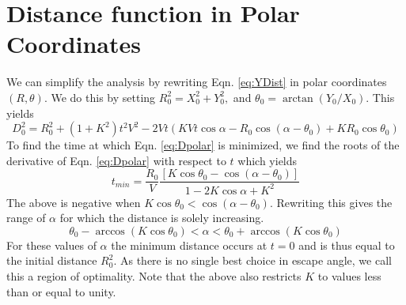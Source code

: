 \documentclass[12pt]{article}
\def\ds{\displaystyle}
\begin{document}
\section{Distance function in Polar Coordinates}
We can simplify the analysis by rewriting Eqn. \ref{eq:YDist} in polar coordinates $(R,\theta)$. We do this by setting $R_0^2 = X_0^2 + Y_0^2,$ and $\theta_0 = \arctan(Y_0/X_0)$. This yields 
%
\begin{equation}
D_0^2 = R_0^2 + (1 + K^2) t^2 V^2 - 
 2 V t(K V t \cos \alpha  - R_0 \cos(\alpha - \theta_0) + K R_0 \cos \theta_0) 
 \label{eq:Dpolar}
\end{equation}
%
To find the time at which Eqn. \ref{eq:Dpolar} is minimized, we find the roots of the derivative of Eqn. \ref{eq:Dpolar} with respect to $t$ which yields
%
\begin{equation}
t_{min} = \ds \frac{R_0}{V} \frac{\left[K \cos \theta_0 - \cos(\alpha - \theta_0)\right ]}{1- 2K \cos \alpha + K^2}
\label{eq:tmin}
\end{equation}
%
The above is negative when $K \cos \theta_0 < \cos(\alpha - \theta_0).$ Rewriting this gives the range of $\alpha$ for which the distance is solely increasing. 
%
\begin{equation}
\theta_0 - \arccos(K \cos \theta_0) < \alpha < \theta_0 + \arccos(K \cos \theta_0)
\label{eq:alphabound}
\end{equation}
%
For these values of $\alpha$ the minimum distance occurs at $t=0$ and is thus equal to the initial distance $R_0^2$. As there is no single best choice in escape angle, we call this a region of optimality. Note that the above also restricts $K$ to values less than or equal to unity.   
\end{document}
